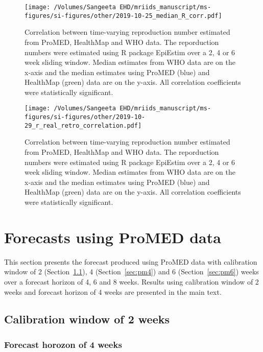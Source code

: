 \documentclass[9pt,twoside,lineno]{pnas-new}
\begin{document}
\begin{figure}
  \centering
  \texttt{[image: /Volumes/Sangeeta EHD/mriids\_manuscript/ms-figures/si-figures/other/2019-10-25\_median\_R\_corr.pdf]}
  \caption{Correlation between time-varying reproduction number estimated from
    ProMED, HealthMap and WHO data. The reporduction numbers were
    estimated using R package EpiEstim over a 2, 4 or 6 week sliding
    window. Median estimates from WHO data are on the x-axis and the
    median estimates using ProMED (blue) and HealthMap (green) data
    are on the y-axis. All correlation coefficients were statistically
  significant.}
  \label{fig:rcorr}
\end{figure}\FloatBarrier


\begin{figure}
  \centering
  \texttt{[image: /Volumes/Sangeeta EHD/mriids\_manuscript/ms-figures/si-figures/other/2019-10-29\_r\_real\_retro\_correlation.pdf]}
  \caption{Correlation between time-varying reproduction number estimated from
    ProMED, HealthMap and WHO data. The reporduction numbers were
    estimated using R package EpiEstim over a 2, 4 or 6 week sliding
    window. Median estimates from WHO data are on the x-axis and the
    median estimates using ProMED (blue) and HealthMap (green) data
    are on the y-axis. All correlation coefficients were statistically
  significant.}
  \label{fig:rcorrrealretro}
\end{figure}\FloatBarrier




\section{Forecasts using ProMED data}\label{sec:pm} 

This section presents the forecast produced using ProMED data with
calibration window of 2 (Section~\ref{sec:pm2}), 
4 (Section~\ref{sec:pm4}) and 6 
(Section~\ref{sec:pm6}) weeks over a 
forecast horizon of 4, 6 and 8 weeks. Results using calibration window
of 2 weeks and forecast horizon of 4 weeks are presented in the main
text.

\subsection{Calibration window of 2 weeks}\label{sec:pm2}
\subsubsection{Forecast horozon of 4 weeks}\label{sec:pm24}
\end{document}
